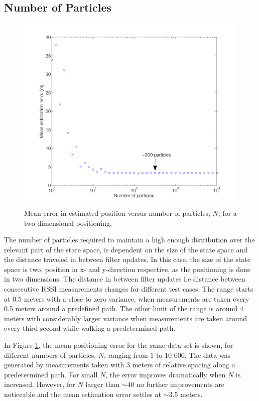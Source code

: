 \documentclass{LTHthesis}
\begin{document}
\subsection{Number of Particles}
%
\begin{figure}[!hbt]

\includegraphics[width=1\textwidth ]{images/pure_rssi/err_vs_N}
\caption{Mean error in estimated position versus number of particles, $N$, for a two dimensional positioning.}\label{err_vs_N}
\end{figure}

The number of particles required to maintain a high enough distribution over the relevant part of the state space, is dependent on the size of the state space and the distance traveled in between filter updates. In this case, the size of the state space is two, position in x- and y-direction respective, as the positioning is done in two dimensions. The distance in between filter updates i.e distance between consecutive RSSI measurements changes for different test cases. The range starts at 0.5 meters with a close to zero variance, when measurements are taken every 0.5 meters around a predefined path. The other limit of the range is around 4 meters with considerably larger variance when measurements are taken around every third second while walking a predetermined path. 

In Figure \ref{err_vs_N}, the mean positioning error for the same data set is shown, for different numbers of particles, $N$, ranging from $1$ to 10 000. The data was generated by measurements taken with 3 meters of relative spacing along a predetermined path. For small $N$, the error improves dramatically when $N$ is increased. However, for $N$ larger than $\sim 40$ no further improvements are noticeable and the mean estimation error settles at $\sim 3.5$ meters. 
\end{document}
